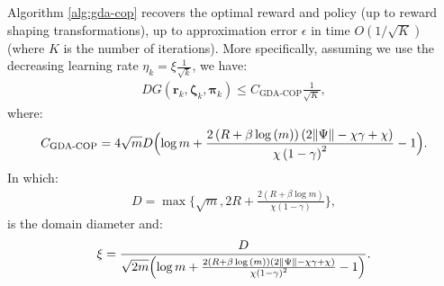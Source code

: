   \begin{theorem}
    \label{thm:GDA_COP_convergence}
    Algorithm \ref{alg:gda-cop} recovers the optimal reward and policy (up to reward shaping transformations), up to approximation error $\epsilon$ in time $O(1/\sqrt{K})$ (where $K$ is the number of iterations). More specifically, assuming we use the decreasing learning rate $\eta_k = \xi \frac{1}{\sqrt{k}}$, we have: 
    \begin{align*}
        DG(\bm{r}_k,\bm{\zeta}_k,\bm{\pi}_k) 
        \leq C_\text{GDA-COP} \frac{1}{\sqrt{K}},
    \end{align*}
    where:
    \begin{align*}
        C_\text{GDA-COP} = 4 
        \sqrt{m} 
        D
        \Bigl( \log m +
        \frac{2\left(R + \beta \log{\left(m \right)}\right) \left(2  \|\Psi\| - \chi \gamma + \chi\right)}{\chi \left(1- \gamma\right)^{2}} 
        -1
        \Bigr).
    \end{align*}
    In which: 
    \begin{align*}
        D = \max\Big\{
            \sqrt{m},
            2R 
            +\frac{2(R +\beta \log m)}{\chi (1-\gamma)} 
            \Big\} ,
    \end{align*}
    is the domain diameter and:
    \begin{align*}
        \xi = \frac{D}{\sqrt{2m} 
        \Bigl( \log m +
        \frac{2\left(R + \beta \log{\left(m \right)}\right) \left(2  \|\Psi\| - \chi \gamma + \chi\right)}{\chi \left(1- \gamma\right)^{2}} 
        -1
        \Bigr)}.
    \end{align*}
  \end{theorem}

